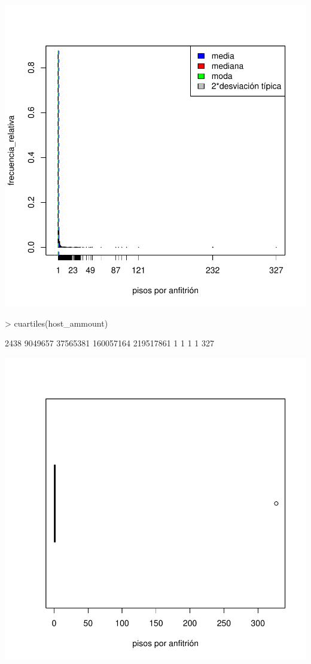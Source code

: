\documentclass [a4paper] {article}
\begin{document}
\begin{center}
\includegraphics{entrega-host_data_plot}
\begin{Schunk}
\begin{Sinput}
> cuartiles(host_ammount)
\end{Sinput}
\begin{Soutput}
     2438   9049657  37565381 160057164 219517861 
        1         1         1         1       327 
\end{Soutput}
\end{Schunk}
\includegraphics{entrega-host_data_plot_c}
\end{center}
\end{document}
